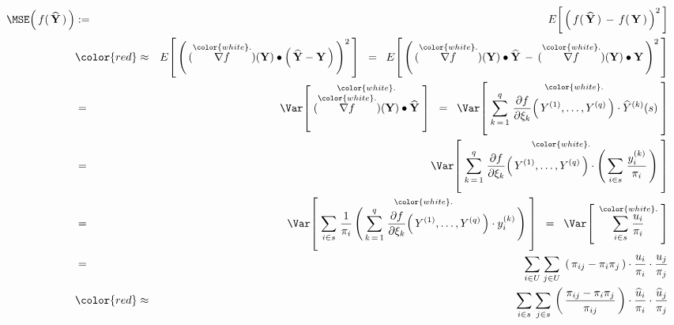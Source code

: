 \begin{eqnarray*}
\MSE\!\left(\,
    f(\,\widehat{\mathbf{Y}}\,)
    \,\right)
& := &
    E\!\left[\,\left(\,
        f(\,\widehat{\mathbf{Y}}\,)
        \, - \,
        f(\,\mathbf{Y}\,)
        \,\right)^{2}\,\right]
\\
& {\color{red}\approx} &
    E\!\left[\,\left(\,
        (\overset{{\color{white}.}}{\nabla f})(\mathbf{Y})
        \bullet
        \left(\,\widehat{\mathbf{Y}} - \mathbf{Y}\,\right)
        \,\right)^{2}\,\right]
\;\; = \;\;
    E\!\left[\,\left(\,
        (\overset{{\color{white}.}}{\nabla f})(\mathbf{Y})
        \bullet
        \widehat{\mathbf{Y}}
        \, - \,
        (\overset{{\color{white}.}}{\nabla f})(\mathbf{Y})
        \bullet
            \mathbf{Y}
        \,\right)^{2}\,\right]
\\
& = &
    \Var\!\left[\;
        \overset{{\color{white}.}}{
            (\overset{{\color{white}.}}{\nabla f})(\mathbf{Y})
            \bullet
            \widehat{\mathbf{Y}}
            }
        \;\right]
\;\; = \;\;
    \Var\!\left[\;
        \overset{{\color{white}.}}{
            \overset{q}{\underset{k\,=\,1}{\sum}}\;
            \dfrac{\partial f}{\partial \xi_{k}}\!\left(\,
                Y^{(1)},\ldots,Y^{(q)}
                \,\right)
            \cdot
            \widehat{Y}^{(k)}(s)
            }
        \;\right]
\\
& = &
    \Var\!\left[\;
        \overset{{\color{white}.}}{
            \overset{q}{\underset{k\,=\,1}{\sum}}\;
            \dfrac{\partial f}{\partial \xi_{k}}\!\left(\,
                Y^{(1)},\ldots,Y^{(q)}
                \,\right)
            \cdot
            \left(\,\underset{i \in s}{\sum}\;\dfrac{y^{(k)}_{i}}{\pi_{i}}\,\right)
            }
        \;\right]
\\
& = &
    \Var\!\left[\;
        \overset{{\color{white}.}}{
            \underset{i \in s}{\sum}\;
            \dfrac{1}{\pi_{i}}
            \left(\,
                \overset{q}{\underset{k\,=\,1}{\sum}}\;
                \dfrac{\partial f}{\partial \xi_{k}}\!\left(\,
                    Y^{(1)},\ldots,Y^{(q)}
                    \,\right)
                \cdot
                y^{(k)}_{i}
                \,\right)
            }
        \;\right]
\;\; = \;\;
    \Var\!\left[\;\,
        \overset{{\color{white}.}}{
            \underset{i \in s}{\sum}\;\dfrac{u_{i}}{\pi_{i}}
            }
        \;\right]
\\
& = &
    \underset{i \in U}{\sum}\;
    \underset{j \in U}{\sum}\;
    \left(\,\pi_{ij} - \pi_{i}\pi_{j}\,\right)
    \cdot
    \dfrac{u_{i}}{\pi_{i}}
    \cdot
    \dfrac{u_{j}}{\pi_{j}}
\\
& {\color{red}\approx} &
    \underset{i \in s}{\sum}\;
    \underset{j \in s}{\sum}\,
    \left(\,
        \dfrac{
            \pi_{ij} - \pi_{i}\pi_{j}
            }{
            \pi_{ij}
            }
        \,\right)
    \cdot
    \dfrac{\widehat{u}_{i}}{\pi_{i}}
    \cdot
    \dfrac{\widehat{u}_{j}}{\pi_{j}}
\end{eqnarray*}


